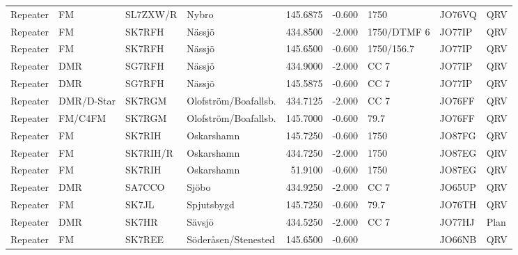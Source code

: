 {\begin{landscape}
\begin{longtable}{llllrrlll}
	Repeater          & FM              & SL7ZXW/R & Nybro                &     145.6875 &     -0.600 & 1750              & JO76VQ      & QRV      \\
	Repeater          & FM              & SK7RFH   & Nässjö               &     434.8500 &     -2.000 & 1750/DTMF 6       & JO77IP      & QRV      \\
	Repeater          & FM              & SK7RFH   & Nässjö               &     145.6500 &     -0.600 & 1750/156.7        & JO77IP      & QRV      \\
	Repeater          & DMR             & SG7RFH   & Nässjö               &     434.9000 &     -2.000 & CC 7              & JO77IP      & QRV      \\
	Repeater          & DMR             & SG7RFH   & Nässjö               &     145.5875 &     -0.600 & CC 7              & JO77IP      & QRV      \\
	Repeater          & DMR/D-Star      & SK7RGM   & Olofström/Boafallsb. &     434.7125 &     -2.000 & CC 7              & JO76FF      & QRV      \\
	Repeater          & FM/C4FM         & SK7RGM   & Olofström/Boafallsb. &     145.7000 &     -0.600 & 79.7              & JO76FF      & QRV      \\
	Repeater          & FM              & SK7RIH   & Oskarshamn           &     145.7250 &     -0.600 & 1750              & JO87FG      & QRV      \\
	Repeater          & FM              & SK7RIH/R & Oskarshamn           &     434.7250 &     -2.000 & 1750              & JO87EG      & QRV      \\
	Repeater          & FM              & SK7RIH   & Oskarshamn           &      51.9100 &     -0.600 & 1750              & JO87EG      & QRV      \\
	Repeater          & DMR             & SA7CCO   & Sjöbo                &     434.9250 &     -2.000 & CC 7              & JO65UP      & QRV      \\
	Repeater          & FM              & SK7JL    & Spjutsbygd           &     145.7250 &     -0.600 & 79.7              & JO76TH      & QRV      \\
	Repeater          & DMR             & SK7HR    & Sävsjö               &     434.5250 &     -2.000 & CC 7              & JO77HJ      & Plan     \\
	Repeater          & FM              & SK7REE   & Söderåsen/Stenested  &     145.6500 &     -0.600 &                   & JO66NB      & QRV      \\

\end{longtable}
\end{landscape}}
